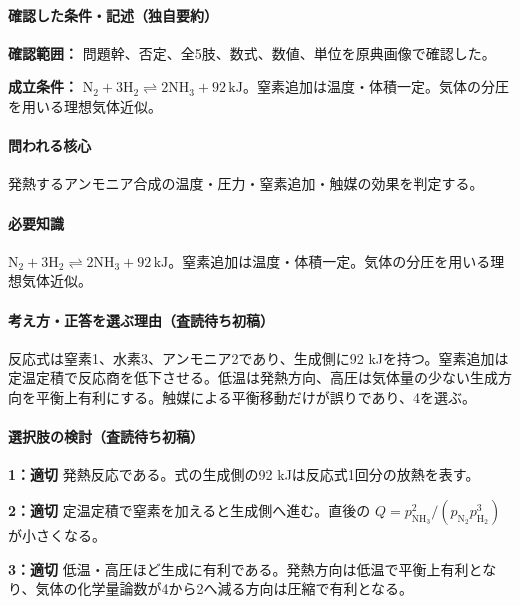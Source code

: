 \paragraph{確認した条件・記述（独自要約）}\mbox{}\par

\noindent\textbf{確認範囲：} 問題幹、否定、全5肢、数式、数値、単位を原典画像で確認した。\par

\noindent\textbf{成立条件：} \(\mathrm{N_2+3H_2\rightleftharpoons2NH_3}+92\,\mathrm{kJ}\)。窒素追加は温度・体積一定。気体の分圧を用いる理想気体近似。\par

\paragraph{問われる核心} 発熱するアンモニア合成の温度・圧力・窒素追加・触媒の効果を判定する。

\paragraph{必要知識} \(\mathrm{N_2+3H_2\rightleftharpoons2NH_3}+92\,\mathrm{kJ}\)。窒素追加は温度・体積一定。気体の分圧を用いる理想気体近似。

\paragraph{考え方・正答を選ぶ理由（査読待ち初稿）} 反応式は窒素1、水素3、アンモニア2であり、生成側に92 kJを持つ。窒素追加は定温定積で反応商を低下させる。低温は発熱方向、高圧は気体量の少ない生成方向を平衡上有利にする。触媒による平衡移動だけが誤りであり、4を選ぶ。

\paragraph{選択肢の検討（査読待ち初稿）}\mbox{}\par

\noindent\textbf{1：適切} 発熱反応である。式の生成側の92 kJは反応式1回分の放熱を表す。\par

\noindent\textbf{2：適切} 定温定積で窒素を加えると生成側へ進む。直後の \(Q=p_{\mathrm{NH_3}}^2/(p_{\mathrm{N_2}}p_{\mathrm{H_2}}^3)\) が小さくなる。\par

\noindent\textbf{3：適切} 低温・高圧ほど生成に有利である。発熱方向は低温で平衡上有利となり、気体の化学量論数が4から2へ減る方向は圧縮で有利となる。\par

